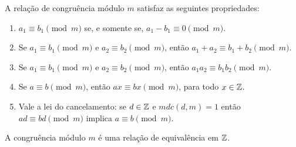\documentclass{beamer}
\begin{document}
    \begin{frame}
        \begin{teorema}
            A relação de congruência módulo $m$ satisfaz as seguintes propriedades:\pause
            \begin{enumerate}[label={\roman*})]
                \item $a_1\equiv b_1\pmod{m}$ se, e somente se, $a_1 - b_1\equiv 0\pmod{m}$.\pause \vspace{.3cm}

                \item Se $a_1\equiv b_1\pmod{m}$ e $a_2\equiv b_2\pmod{m}$, então $a_1+a_2\equiv b_1+b_2\pmod{m}$.\pause \vspace{.3cm}

                \item Se $a_1\equiv b_1\pmod{m}$ e $a_2\equiv b_2\pmod{m}$, então $a_1a_2\equiv b_1b_2\pmod{m}$.\label{item_provado}\pause \vspace{.3cm}

                \item Se $a\equiv b\pmod{m}$, então $ax\equiv bx\pmod{m}$, para todo $x \in \mathbb{Z}$.\pause \vspace{.3cm}

                \item Vale a lei do cancelamento: se $d \in \mathbb{Z}$ e $mdc(d, m) = 1$ então $ad \equiv bd \pmod m$ implica $a\equiv b \pmod m$.
            \end{enumerate}
        \end{teorema}
    \end{frame}

    \begin{frame}
        \begin{proposicao}
            A congruência módulo $m$ é uma relação de equivalência em $\mathbb{Z}$.
        \end{proposicao}
    \end{frame}
\end{document}
